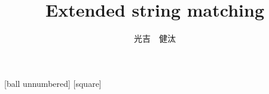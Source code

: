 \usepackage{bxdpx-beamer} %
\usepackage{pxjahyper} %
\usepackage{minijs} %
\usepackage{latexsym}
\usepackage[deluxe,expert]{otf}
\renewcommand{\kanjifamilydefault}{\gtdefault} %

\usepackage{tikz}
\usetikzlibrary{calc,decorations.pathreplacing,quotes,positioning,shapes,fit,arrows,backgrounds,tikzmark}

\usepackage{standalone}
\usepackage{import}

\usepackage{xcolor}
[ball unnumbered]
[square]

\usepackage[T1]{fontenc}%
\usepackage[utf8]{inputenc}%
\usepackage{txfonts}%
\usepackage{bm}%

\usepackage{amsmath,amssymb}
\usepackage{amsthm}
\usepackage{algorithm, algpseudocode}
\usepackage{enumitem}

\newcommand{\func}[1]{\ensuremath\mathrm{#1}}
\newcommand{\Scatter}{\text{\scshape Scatter}}
\newcommand{\Gather}{\text{\textsc{Gather}}}
\newcommand{\Propagate}{\func{\text{\textsc{Propagate}}}}
\newcommand{\ShiftAnd}{\textbf{Shift-And}}
\newcommand{\BNDM}{\textbf{BNDM}}
\providecommand{\as}{\textasteriskcentered}
\providecommand{\pl}{\text{+}}

\providecommand{\ImportStandalone}[3]{
	\IfStandalone{
		{#3}
		}{
		{#3}
	}
}

\title{Extended string matching}
\author{光吉　健汰}

